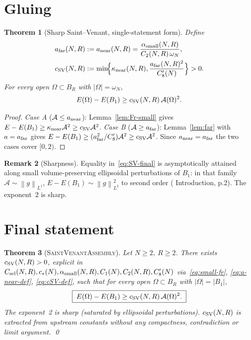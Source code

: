 \documentclass[11pt]{article}
\newtheorem{theorem}{Theorem}[section]
\theoremstyle{definition}
\newtheorem{remark}[theorem]{Remark}
\newcommand{\norm}[1]{\left\|#1\right\|}
\newcommand{\Fr}{\mathcal{A}}
\begin{document}
\section{Gluing}\label{sec:glue}

\begin{theorem}[Sharp Saint--Venant, single-statement form]\label{thm:SV}
Define
\begin{align}
   a_{\rm far}(N,R)&:=a_{\rm near}(N,R)=\frac{\alpha_{\rm small}(N,R)}{C_{2}(N,R)\,\omega_{N}},
   \label{eq:afar-def}\\
   c_{\rm SV}(N,R)&:=\min\!\Bigl\{\kappa_{\rm near}(N,R),\frac{a_{\rm far}(N,R)^{2}}{C_{8}'(N)}\Bigr\}>0.
   \label{eq:cSV-def}
\end{align}
For every open $\Omega\subset B_{R}$ with $|\Omega|=\omega_{N}$,
\begin{equation}\label{eq:SV-final}
   E(\Omega)-E(B_{1})\ge c_{\rm SV}(N,R)\,\Fr(\Omega)^{2}.
\end{equation}
\end{theorem}

\begin{proof}
\emph{Case A} ($\Fr\le a_{\rm near}$): Lemma~\ref{lem:Fr-small} gives
$E-E(B_{1})\ge\kappa_{\rm near}\Fr^{2}\ge c_{\rm SV}\Fr^{2}$.
\emph{Case B} ($\Fr\ge a_{\rm far}$): Lemma~\ref{lem:far} with
$a=a_{\rm far}$ gives $E-E(B_{1})\ge(a_{\rm far}^{2}/C_{8}')\Fr^{2}\ge c_{\rm SV}\Fr^{2}$.
Since $a_{\rm near}=a_{\rm far}$ the two cases cover $[0,2)$.
\end{proof}

\begin{remark}[Sharpness]
Equality in~\eqref{eq:SV-final} is asymptotically attained along small
volume-preserving ellipsoidal perturbations of $B_{1}$: in that family
$\Fr\sim\norm{g}_{L^{1}}$, $E-E(B_{1})\sim\norm{g}_{L^{2}}^{2}$ to
second order (\cite{BDV} Introduction, p.2). The exponent~$2$ is sharp.
\end{remark}

\section{Final statement}\label{sec:thm}

\begin{theorem}[\textsc{SaintVenantAssembly}]\label{thm:SVA-main}
Let $N\ge 2$, $R\ge 2$. There exists $c_{\rm SV}(N,R)>0$, explicit in
$C_{\rm sel}(N,R), c_{*}(N), \alpha_{\rm small}(N,R), C_{1}(N), C_{2}(N,R),
C_{8}'(N)$ via~\eqref{eq:small-fr}, \eqref{eq:a-near-def},
\eqref{eq:cSV-def}, such that for every open $\Omega\subset B_{R}$ with
$|\Omega|=|B_{1}|$,
\[
   \boxed{\;E(\Omega)-E(B_{1})\ge c_{\rm SV}(N,R)\,\Fr(\Omega)^{2}.\;}
\]
The exponent~2 is sharp (saturated by ellipsoidal perturbations).
$c_{\rm SV}(N,R)$ is extracted from upstream constants without any
compactness, contradiction or limit argument. \qed
\end{theorem}
\end{document}

